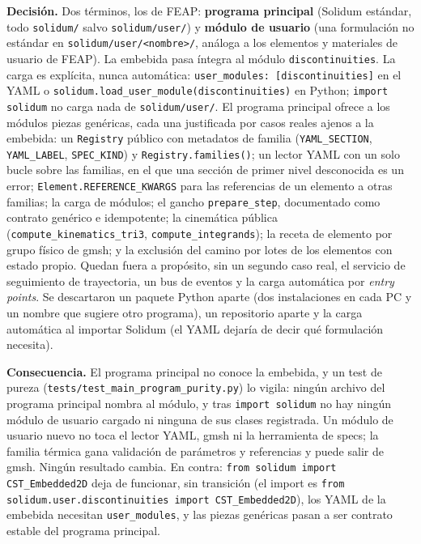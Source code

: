 \documentclass[11pt,oneside]{report}
\begin{document}
\textbf{Decisión.} Dos términos, los de FEAP: \textbf{programa principal} (Solidum estándar, todo \texttt{solidum/} salvo \texttt{solidum/user/}) y \textbf{módulo de usuario} (una formulación no estándar en \texttt{solidum/\allowbreak{}user/\allowbreak{}\textless{}nombre\textgreater{}/\allowbreak{}}, análoga a los elementos y materiales de usuario de FEAP). La embebida pasa íntegra al módulo \texttt{discontinuities}. La carga es explícita, nunca automática: \texttt{user\_\allowbreak{}modules: [discontinuities]} en el YAML o \texttt{solidum.\allowbreak{}load\_\allowbreak{}user\_\allowbreak{}module(\textquotedbl{}discontinuities\textquotedbl{})} en Python; \texttt{import solidum} no carga nada de \texttt{solidum/user/}. El programa principal ofrece a los módulos piezas genéricas, cada una justificada por casos reales ajenos a la embebida: un \texttt{Registry} público con metadatos de familia (\texttt{YAML\_SECTION}, \texttt{YAML\_LABEL}, \texttt{SPEC\_KIND}) y \texttt{Registry.\allowbreak{}families()}; un lector YAML con un solo bucle sobre las familias, en el que una sección de primer nivel desconocida es un error; \texttt{Element.\allowbreak{}REFERENCE\_\allowbreak{}KWARGS} para las referencias de un elemento a otras familias; la carga de módulos; el gancho \texttt{prepare\_step}, documentado como contrato genérico e idempotente; la cinemática pública (\texttt{compute\_\allowbreak{}kinematics\_\allowbreak{}tri3}, \texttt{compute\_\allowbreak{}integrands}); la receta de elemento por grupo físico de gmsh; y la exclusión del camino por lotes de los elementos con estado propio. Quedan fuera a propósito, sin un segundo caso real, el servicio de seguimiento de trayectoria, un bus de eventos y la carga automática por \textit{entry points}. Se descartaron un paquete Python aparte (dos instalaciones en cada PC y un nombre que sugiere otro programa), un repositorio aparte y la carga automática al importar Solidum (el YAML dejaría de decir qué formulación necesita).

\textbf{Consecuencia.} El programa principal no conoce la embebida, y un test de pureza (\texttt{tests/\allowbreak{}test\_\allowbreak{}main\_\allowbreak{}program\_\allowbreak{}purity.\allowbreak{}py}) lo vigila: ningún archivo del programa principal nombra al módulo, y tras \texttt{import solidum} no hay ningún módulo de usuario cargado ni ninguna de sus clases registrada. Un módulo de usuario nuevo no toca el lector YAML, gmsh ni la herramienta de specs; la familia térmica gana validación de parámetros y referencias y puede salir de gmsh. Ningún resultado cambia. En contra: \texttt{from solidum import CST\_\allowbreak{}Embedded2D} deja de funcionar, sin transición (el import es \texttt{from solidum.\allowbreak{}user.\allowbreak{}discontinuities import CST\_\allowbreak{}Embedded2D}), los YAML de la embebida necesitan \texttt{user\_modules}, y las piezas genéricas pasan a ser contrato estable del programa principal.
\end{document}
